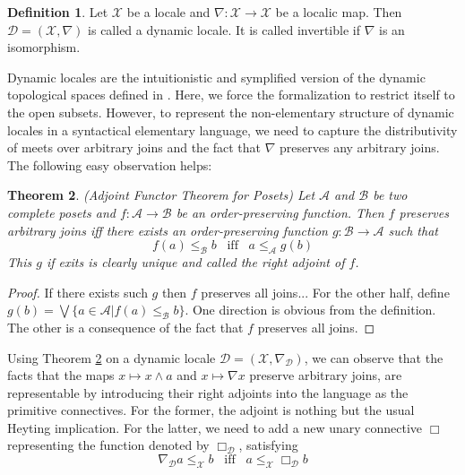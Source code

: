 \documentclass[12pt,a4paper]{article}
\theoremstyle{plain}
\newtheorem{thm}{Theorem}[section]
\theoremstyle{definition}
\newtheorem{dfn}[thm]{Definition}
\begin{document}
\begin{dfn}
Let $\mathscr{X}$ be a locale and $\nabla: \mathscr{X} \to \mathscr{X}$ be a localic map. Then $\mathcal{D}=(\mathscr{X}, \nabla)$ is called a dynamic locale. It is called invertible if $\nabla$ is an isomorphism.
\end{dfn}

Dynamic locales are the intuitionistic and symplified version of the dynamic topological spaces defined in \cite{}. Here, we force the formalization to restrict itself to the open subsets. However, to represent the non-elementary structure of dynamic locales in a syntactical elementary language, we need to capture the distributivity of meets over arbitrary joins and the fact that $\nabla$ preserves any arbitrary joins. The following easy observation helps:

\begin{thm}(Adjoint Functor Theorem for Posets) \label{AFT}
Let $\mathcal{A}$ and $\mathcal{B}$ be two complete posets and $f:\mathcal{A} \to \mathcal{B}$ be an order-preserving function. Then $f$ preserves arbitrary joins iff there exists an order-preserving function $g: \mathcal{B} \to \mathcal{A}$ such that
\[
f(a) \leq_{\mathcal{B}} b  \;\;\; \text{iff}  \;\;\; a \leq_{\mathcal{A}} g(b)
\]
This $g$ if exits is clearly unique and called the right adjoint of $f$.
\end{thm}
\begin{proof}
If there exists such $g$ then $f$ preserves all joins... For the other half, define $g(b)=\bigvee \{a \in \mathcal{A} | f(a) \leq_{\mathcal{B}} b \}$. One direction is obvious from the definition. The other is a consequence of the fact that $f$ preserves all joins.
\end{proof}

Using Theorem \ref{AFT} on a dynamic locale $\mathcal{D}=(\mathscr{X}, \nabla_{\mathcal{D}})$, we can observe that the facts that the maps $x \mapsto x \wedge a$ and $x \mapsto \nabla x$ preserve arbitrary joins, are representable by introducing their right adjoints into the language as the primitive connectives. For the former, the adjoint is nothing but the usual Heyting implication. For the latter, we need to add a new unary connective $\Box$ representing the function denoted by $\Box_{\mathcal{D}}$, satisfying
\[
\nabla_{\mathcal{D}} a \leq_{\mathscr{X}} b  \;\;\; \text{iff}  \;\;\; a \leq_{\mathscr{X}} \Box_{\mathcal{D}} b
\]
\end{document}
